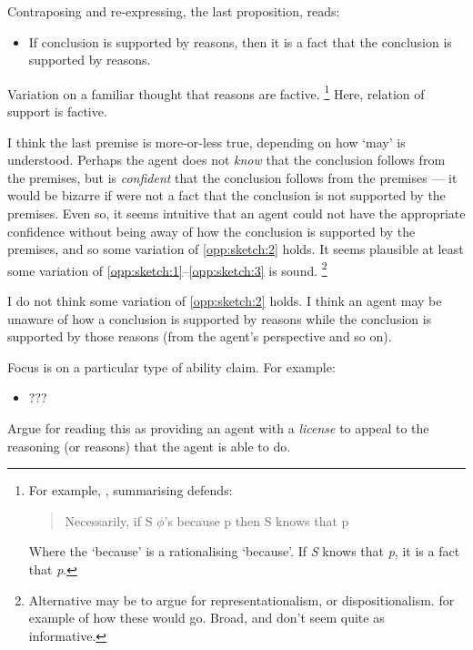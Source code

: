 \documentclass[10pt]{article}
\begin{document}
Contraposing and re-expressing, the last proposition, reads:

\begin{itemize}
\item If conclusion is supported by reasons, then it is a fact that the conclusion is supported by reasons.
\end{itemize}

Variation on a familiar thought that reasons are factive.\nolinebreak
\footnote{
  For example, \textcite[673]{Cunningham:2020aa}, summarising \textcite{Hornsby:2007aa,Hornsby:2007ab,Hornsby:2008aa} defends:
  \begin{quote}
    Necessarily, if S \(\phi\)'s because p then S knows that p
  \end{quote}
  Where the `because' is a rationalising `because'.
  If \emph{S} knows that \emph{p}, it is a fact that \emph{p}.
}
Here, relation of support is factive.

I think the last premise is more-or-less true, depending on how `may' is understood.
Perhaps the agent does not \emph{know} that the conclusion follows from the premises, but is \emph{confident} that the conclusion follows from the premises --- it would be bizarre if were not a fact that the conclusion is not supported by the premises.
Even so, it seems intuitive that an agent could not have the appropriate confidence without being away of how the conclusion is supported by the premises, and so some variation of \ref{opp:sketch:2} holds.
It seems plausible at least some variation of \ref{opp:sketch:1}--\ref{opp:sketch:3} is sound.\nolinebreak
\footnote{
  Alternative may be to argue for representationalism, or dispositionalism.
  \citeauthor{Neta:2019aa} for example of how these would go.
  Broad, and don't seem quite as informative.
}

I do not think some variation of \ref{opp:sketch:2} holds.
I think an agent may be unaware of how a conclusion is supported by reasons while the conclusion is supported by those reasons (from the agent's perspective and so on).

Focus is on a particular type of ability claim.
For example:
\begin{itemize}
\item ???
\end{itemize}

Argue for reading this as providing an agent with a \emph{license} to appeal to the reasoning (or reasons) that the agent is able to do.
\end{document}
